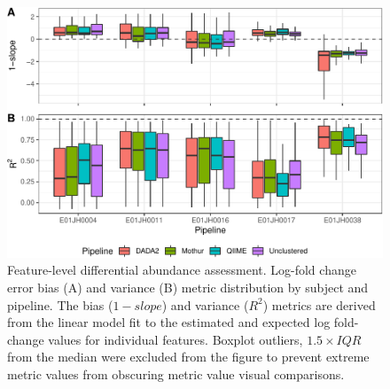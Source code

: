 \documentclass[12pt]{article}
\begin{document}
\begin{figure}
\centering
\includegraphics[width=0.9\linewidth]{logFcErrorMetrics-1.pdf}
\caption{\label{fig:logFcErrorMetrics}Feature-level differential abundance assessment.
Log-fold change error
bias (A) and variance (B) metric distribution by subject and pipeline.
The bias (\(1 - slope\)) and variance (\(R^2\)) metrics are derived from
the linear model fit to the estimated and expected log fold-change
values for individual features. Boxplot outliers, \(1.5\times IQR\) from
the median were excluded from the figure to prevent extreme metric
values from obscuring metric value visual comparisons.}
\end{figure}
\end{document}
